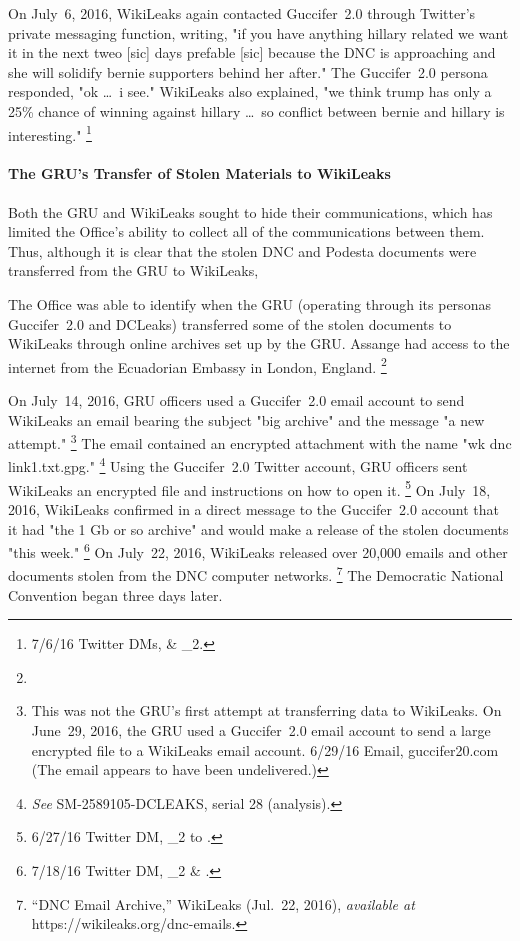 On July~6, 2016, WikiLeaks again contacted Guccifer~2.0 through Twitter's private messaging function, writing, "if you have anything hillary related we want it in the next tweo [sic] days prefable [sic] because the DNC is approaching and she will solidify bernie supporters behind her after."
The Guccifer~2.0 persona responded, "ok \dots\ i see."
WikiLeaks also explained, "we think trump has only a 25\% chance of winning against hillary \dots\ so conflict between bernie and hillary is interesting."%
\footnote{7/6/16 Twitter DMs, \@WikiLeaks \& \@guccifer\_2.}

\paragraph{The GRU's Transfer of Stolen Materials to WikiLeaks}

Both the GRU and WikiLeaks sought to hide their communications, which has limited the Office's ability to collect all of the communications between them.
Thus, although it is clear that the stolen DNC and Podesta documents were transferred from the GRU to WikiLeaks, 

The Office was able to identify when the GRU (operating through its personas Guccifer~2.0 and DCLeaks) transferred some of the stolen documents to WikiLeaks through online archives set up by the GRU\null.
Assange had access to the internet from the Ecuadorian Embassy in London, England.
\footnote{}

On July~14, 2016, GRU officers used a Guccifer~2.0 email account to send WikiLeaks an email bearing the subject "big archive" and the message "a new attempt."%
\footnote{This was not the GRU's first attempt at transferring data to WikiLeaks.
On June~29, 2016, the GRU used a Guccifer~2.0 email account to send a large encrypted file to a WikiLeaks email account.
6/29/16 Email, guccifer20\@mail.com
(The email appears to have been undelivered.)}
The email contained an encrypted attachment with the name "wk dnc link1.txt.gpg."%
\footnote{\textit{See} SM-2589105-DCLEAKS, serial 28 (analysis).}
Using the Guccifer~2.0 Twitter account, GRU officers sent WikiLeaks an encrypted file and instructions on how to open it.%
\footnote{6/27/16 Twitter DM, \@Guccifer\_2 to \@WikiLeaks.}
On July~18, 2016, WikiLeaks confirmed in a direct message to the Guccifer~2.0 account that it had "the 1 Gb or so archive" and would make a release of the stolen documents "this week."%
\footnote{7/18/16 Twitter DM, \@Guccifer\_2 \& \@WikiLeaks.}
On July~22, 2016, WikiLeaks released over 20,000 emails and other documents stolen from the DNC computer networks.%
\footnote{``DNC Email Archive,'' WikiLeaks (Jul.~22, 2016), \textit{available at} https://wikileaks.org/dnc-emails.}
The Democratic National Convention began three days later.

